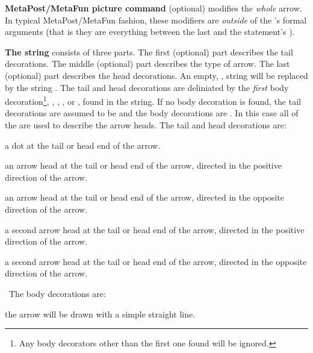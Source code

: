 \item {\bf MetaPost/MetaFun picture command} (optional) modifies the
\emph{whole} arrow. In typical MetaPost/MetaFun fashion, these modifiers
are \emph{outside} of the 's formal arguments (that is they
are everything between the last  and the statement's ).

\stopitemize


{\bf The  string} consists of three parts. The
first (optional) part describes the tail decorations. The middle
(optional) part describes the type of arrow. The last (optional) part
describes the head decorations. An empty, ,
 string will be replaced by the string .
The tail and head decorations are deliniated by the \emph{first} body
decoration\footnote{Any body decorators other than the first one found
will be ignored.}, , , , or ,
found in the string. If no body decoration is found, the tail decorations
are assumed to be  and the body decorations are . In
this case all of the  are used to describe the
arrow heads. The tail and head decorations are:

\startitemize

\item {} a dot at the tail or head end of the arrow.

\item {} an arrow head at the tail or head end of the arrow,
directed in the positive direction of the arrow.

\item {} an arrow head at the tail or head end of the arrow,
directed in the opposite direction of the arrow.

\item \type{"]"} a second arrow head at the tail or head
end of the arrow, directed in the positive direction of the arrow.

\item \type{"["} a second arrow head at the tail or head
end of the arrow, directed in the opposite direction of the arrow.

\stopitemize

\noindent\ The body decorations are:

\startitemize

\item {} the arrow will be drawn with a simple straight line.

